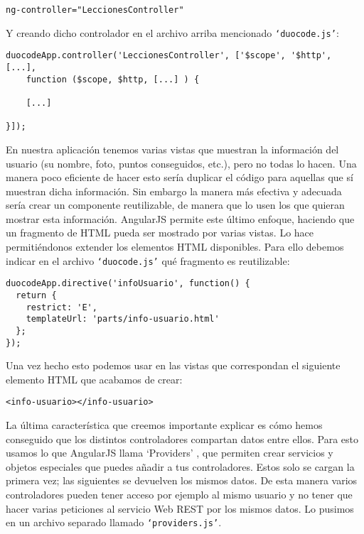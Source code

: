 {\codesize
\begin{verbatim}
ng-controller="LeccionesController"
\end{verbatim}
}

Y creando dicho controlador en el archivo arriba mencionado \texttt{`duocode.js'}:

\vspace{1em}
{\codesize
\lstset{}
\begin{lstlisting}[frame=single]
duocodeApp.controller('LeccionesController', ['$scope', '$http', [...], 
    function ($scope, $http, [...] ) {
    
	[...] 

}]);
\end{lstlisting}
}
\vspace{1em}

En nuestra aplicación tenemos varias vistas que muestran la información del usuario (su nombre, foto, puntos conseguidos, etc.), pero no todas lo hacen. Una manera poco eficiente de hacer esto sería duplicar el código para aquellas que sí muestran dicha información. Sin embargo la manera más efectiva y adecuada sería crear un componente reutilizable, de manera que lo usen los que quieran mostrar esta información. AngularJS permite este último enfoque, haciendo que un fragmento de HTML pueda ser mostrado por varias vistas. Lo hace permitiéndonos extender los elementos HTML disponibles. Para ello debemos indicar en el archivo \texttt{`duocode.js'} qué fragmento es reutilizable: 

\vspace{1em}
{\codesize
\lstset{}
\begin{lstlisting}[frame=single]
duocodeApp.directive('infoUsuario', function() {
  return {
    restrict: 'E',
    templateUrl: 'parts/info-usuario.html'
  };
});
\end{lstlisting}
}
\vspace{1em}

Una vez hecho esto podemos usar en las vistas que correspondan el siguiente elemento HTML que acabamos de crear:

{\codesize
\begin{verbatim}
<info-usuario></info-usuario>
\end{verbatim}
}

La última característica que creemos importante explicar es cómo hemos conseguido que los distintos controladores compartan datos entre ellos. Para esto usamos lo que AngularJS llama `Providers' \cite{providers}, que permiten crear servicios y objetos especiales que puedes añadir a tus controladores. Estos solo se cargan la primera vez; las siguientes se devuelven los mismos datos. De esta manera varios controladores pueden tener acceso por ejemplo al mismo usuario y no tener que hacer varias peticiones al servicio Web REST por los mismos datos. Lo pusimos en un archivo separado llamado \texttt{`providers.js'}.

